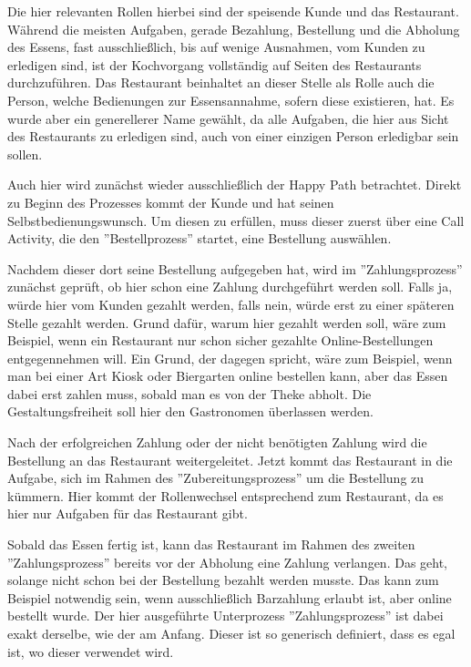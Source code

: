 Die hier relevanten Rollen hierbei sind der speisende Kunde und das Restaurant.
Während die meisten Aufgaben, gerade Bezahlung, Bestellung und die Abholung des Essens, fast ausschließlich, bis auf wenige Ausnahmen, vom Kunden zu erledigen sind, ist der Kochvorgang vollständig auf Seiten des Restaurants durchzuführen. Das Restaurant beinhaltet an dieser Stelle als Rolle auch die Person, welche Bedienungen zur Essensannahme, sofern diese existieren, hat. Es wurde aber ein generellerer Name gewählt, da alle Aufgaben, die hier aus Sicht des Restaurants zu erledigen sind, auch von einer einzigen Person erledigbar sein sollen. 



Auch hier wird zunächst wieder ausschließlich der Happy Path betrachtet. Direkt zu Beginn des Prozesses kommt der Kunde und hat seinen Selbstbedienungswunsch. Um diesen zu erfüllen, muss dieser zuerst über eine Call Activity, die den ''Bestellprozess'' startet, eine Bestellung auswählen. 

Nachdem dieser dort seine Bestellung aufgegeben hat, wird im ''Zahlungsprozess'' zunächst geprüft, ob hier schon eine Zahlung durchgeführt werden soll. Falls ja, würde hier vom Kunden gezahlt werden, falls nein, würde erst zu einer späteren Stelle gezahlt werden. Grund dafür, warum hier gezahlt werden soll, wäre zum Beispiel, wenn ein Restaurant nur schon sicher gezahlte Online-Bestellungen entgegennehmen will. Ein Grund, der dagegen spricht, wäre zum Beispiel, wenn man bei einer Art Kiosk oder Biergarten online bestellen kann, aber das Essen dabei erst zahlen muss, sobald man es von der Theke abholt. Die Gestaltungsfreiheit soll hier den Gastronomen überlassen werden.

Nach der erfolgreichen Zahlung oder der nicht benötigten Zahlung wird die Bestellung an das Restaurant weitergeleitet. Jetzt kommt das Restaurant in die Aufgabe, sich im Rahmen des ''Zubereitungsprozess'' um die Bestellung zu kümmern. Hier kommt der Rollenwechsel entsprechend zum Restaurant, da es hier nur Aufgaben für das Restaurant gibt. 

Sobald das Essen fertig ist, kann das Restaurant im Rahmen des zweiten ''Zahlungsprozess'' bereits vor der Abholung eine Zahlung verlangen. Das geht, solange nicht schon bei der Bestellung bezahlt werden musste. Das kann zum Beispiel notwendig sein, wenn ausschließlich Barzahlung erlaubt ist, aber online bestellt wurde. Der hier ausgeführte Unterprozess ''Zahlungsprozess'' ist dabei exakt derselbe, wie der am Anfang. Dieser ist so generisch definiert, dass es egal ist, wo dieser verwendet wird.

